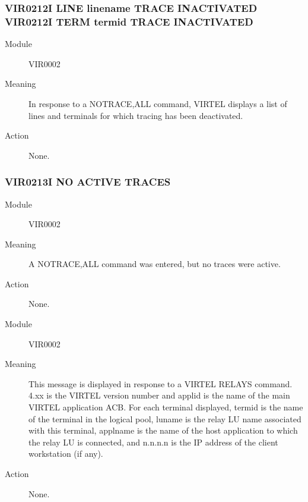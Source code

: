 \documentclass[letterpaper,10pt,english]{sphinxmanual}
\begin{document}
\subsubsection{VIR0212I LINE linename TRACE INACTIVATED VIR0212I TERM termid TRACE INACTIVATED}
\label{\detokenize{messages:vir0212i-line-linename-trace-inactivated-vir0212i-term-termid-trace-inactivated}}\begin{description}
\item[{Module}] \leavevmode
VIR0002

\item[{Meaning}] \leavevmode
In response to a NOTRACE,ALL command, VIRTEL displays a list of lines and terminals for which tracing has been deactivated.

\item[{Action}] \leavevmode
None.

\end{description}


\subsubsection{VIR0213I NO ACTIVE TRACES}
\label{\detokenize{messages:vir0213i-no-active-traces}}\begin{description}
\item[{Module}] \leavevmode
VIR0002

\item[{Meaning}] \leavevmode
A NOTRACE,ALL command was entered, but no traces were active.

\item[{Action}] \leavevmode
None.

\end{description}
\begin{description}
\item[{Module}] \leavevmode
VIR0002

\item[{Meaning}] \leavevmode
This message is displayed in response to a VIRTEL RELAYS command. 4.xx is the VIRTEL version number and applid is the name of the main VIRTEL application ACB. For each terminal displayed, termid is the name of the terminal in the logical pool, luname is the relay LU name associated with this terminal, applname is the name of the host application to which the relay LU is connected, and n.n.n.n is the IP address of the client workstation (if any).

\item[{Action}] \leavevmode
None.

\end{description}
\end{document}
